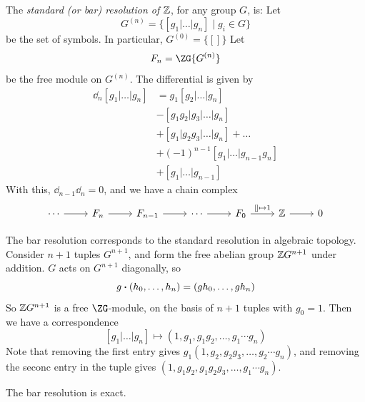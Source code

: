 \documentclass{article}
\begin{document}
\begin{definition}
    The \emph{standard (or bar) resolution of \(\mathbb{Z}\)}, for any group \(G\), is: Let
    \[G^{(n)} = \{[g_1\vert\dots\vert g_n] \mid g_i \in G\}\]
    be the set of symbols. In particular, \(G^{(0)} = \{[]\}\) Let
    \[F_n = \ZG\{G^{(n)}\}\]
    be the free module on \(G^{(n)}\). The differential is given by
    \begin{align*}
        \dd_n[g_1\vert\dots\vert g_n] &= g_1[g_2\vert\dots\vert g_n] \\
        &- [g_1g_2\vert g_3\vert\dots\vert g_n] \\
        &+ [g_1\vert g_2g_3\vert\dots\vert g_n] + \dots \\
        &+ (-1)^{n-1}[g_1\vert\dots\vert g_{n-1}g_n] \\
        &+ [g_1\vert\dots\vert g_{n-1}]
    \end{align*}
    With this, \(\dd_{n-1} \dd_n = 0\), and we have a chain complex
    \[\begin{tikzcd}
        \cdots & {F_n} & {F_{n-1}} & \cdots & {F_0} & \Z & 0
        \arrow["{[]\mapsto 1}", from=1-5, to=1-6]
        \arrow[from=1-1, to=1-2]
        \arrow[from=1-2, to=1-3]
        \arrow[from=1-3, to=1-4]
        \arrow[from=1-4, to=1-5]
        \arrow[from=1-6, to=1-7]
    \end{tikzcd}\]
\end{definition}

\begin{remark}
    The bar resolution corresponds to the standard resolution in algebraic topology. Consider \(n+1\) tuples \(G^{n+1}\), and form the free abelian group \(\mathbb{Z} G^{n+1}\) under addition. \(G\) acts on \(G^{n+1}\) diagonally, so
    \[g\vdot (h_0, \dots, h_n) = (gh_0, \dots, gh_n)\]
    So \(\mathbb{Z} G^{n+1}\) is a free \(\ZG\)-module, on the basis of \(n+1\) tuples with \(g_0 = 1\). Then we have a correspondence
    \[[g_1\vert\dots\vert g_n] \mapsto (1, g_1, g_1g_2, \dots, g_1\cdots g_n)\]
    Note that removing the first entry gives \(g_1(1, g_2, g_2g_3, \dots, g_2\cdots g_n)\), and removing the seconc entry in the tuple gives \((1, g_1g_2, g_1g_2g_3, \dots, g_1\cdots g_n)\).
\end{remark}

\begin{lemma}
    The bar resolution is exact.
\end{lemma}
\end{document}
